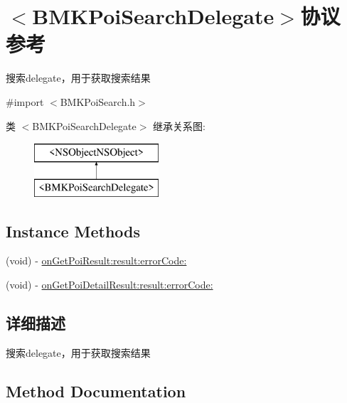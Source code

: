 \hypertarget{protocol_b_m_k_poi_search_delegate-p}{}\section{$<$B\+M\+K\+Poi\+Search\+Delegate$>$协议 参考}
\label{protocol_b_m_k_poi_search_delegate-p}


搜索delegate，用于获取搜索结果  




{\ttfamily \#import $<$B\+M\+K\+Poi\+Search.\+h$>$}

类 $<$B\+M\+K\+Poi\+Search\+Delegate$>$ 继承关系图\+:\begin{figure}[H]
\begin{center}
\leavevmode
\includegraphics[height=2.000000cm]{protocol_b_m_k_poi_search_delegate-p}
\end{center}
\end{figure}
\subsection*{Instance Methods}
\begin{DoxyCompactItemize}
\item 
(void) -\/ \hyperlink{protocol_b_m_k_poi_search_delegate-p_ac37fca8bc7dc97af6e2eccdf5c17bcf7}{on\+Get\+Poi\+Result\+:result\+:error\+Code\+:}
\item 
(void) -\/ \hyperlink{protocol_b_m_k_poi_search_delegate-p_a510274f805b822e918ed2d1374577b8b}{on\+Get\+Poi\+Detail\+Result\+:result\+:error\+Code\+:}
\end{DoxyCompactItemize}


\subsection{详细描述}
搜索delegate，用于获取搜索结果 

\subsection{Method Documentation}
\hypertarget{protocol_b_m_k_poi_search_delegate-p_a510274f805b822e918ed2d1374577b8b}{}
